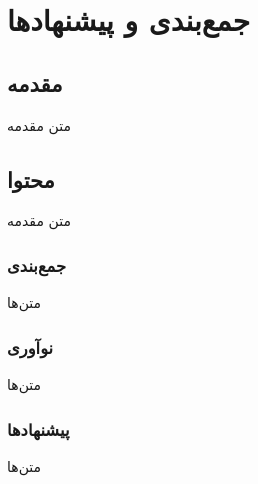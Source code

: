 \section{جمع‌بندی و پیشنهاد‌ها}\label{sec:recom}

\subsection{مقدمه}\label{subsec:recom_intro}
متن مقدمه

\subsection{محتوا}\label{subsec:recom_mohtava}
متن مقدمه

\subsubsection{جمع‌بندی}
متن‌ها

\subsubsection{نوآوری}
متن‌ها

\subsubsection{پیشنهاد‌ها}
متن‌ها



\cleardoublepage 